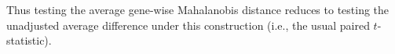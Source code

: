 \noindent Thus testing the average gene-wise Mahalanobis distance reduces to testing the unadjusted average difference under this construction (i.e., the usual paired $t$-statistic).
%
